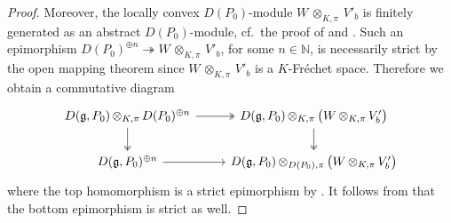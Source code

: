 \documentclass[a4paper, reqno, 10pt]{amsart}
\theoremstyle{definition}
\numberwithin{equation}{section}
\newcommand{\botimes}[1]{{\,\otimes_{#1}\,}}
\newcommand{\BN}{{\mathbb {N}}}
\newcommand{\Fg}{{\mathfrak {g}}}
\begin{document}
\begin{proof}
	
	Moreover, the locally convex $D(P_0)$-module $W \botimes{K,\pi} V'_b$ is finitely generated as an abstract $D(P_0)$-module, cf.\ the proof of \cite[Prop.\ 4.1.5]{AgrawalStrauch22FromCatOLocAnRep} and \cite[Prop.\ 6.4.1]{AgrawalStrauch22FromCatOLocAnRep}.
	Such an epimorphism $D(P_0)^{\oplus n} \twoheadrightarrow W \botimes{K,\pi} V'_b$, for some $n\in \BN$, is necessarily strict by the open mapping theorem \cite[Prop.\ 8.6]{Schneider02NonArchFunctAna} since $W\botimes{K,\pi} V'_b$ is a $K$-Fr\'echet space.
	Therefore we obtain a commutative diagram 
	\begin{equation*}
		\begin{tikzcd}
			D(\Fg,P_0) \botimes{K,\pi} D(P_0)^{\oplus n} \ar[r, two heads] \ar[d, two heads] & D(\Fg,P_0) \botimes{K,\pi} \big(W \botimes{K,\pi} V'_b \big) \ar[d, two heads] \\
			D(\Fg,P_0)^{\oplus n} \ar[r] & D(\Fg,P_0) \botimes{D(P_0),\pi} \big(W\botimes{K,\pi} V'_b \big)
		\end{tikzcd}
	\end{equation*}
	where the top homomorphism is a strict epimorphism by \cite[Lemma 2.1 (ii)]{BreuilHerzig18TowardsFinSlopePartGLn}.
	It follows from \cite[Lemma 2]{KopylovKuzminov00KerCokerSeqSemiAbCat} that the bottom epimorphism is strict as well.
	

\end{proof}
\end{document}
